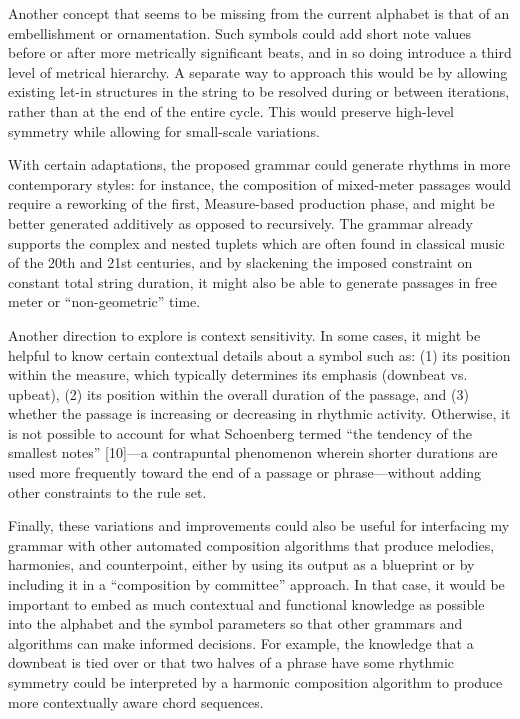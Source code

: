 \documentclass{article}
\begin{document}
Another concept that seems to be missing from the current alphabet is that of an embellishment or ornamentation. Such symbols could add short note values before or after more metrically significant beats, and in so doing introduce a third level of metrical hierarchy. A separate way to approach this would be by allowing existing let-in structures in the string to be resolved during or between iterations, rather than at the end of the entire cycle. This would preserve high-level symmetry while allowing for small-scale variations.

With certain adaptations, the proposed grammar could generate rhythms in more contemporary styles: for instance, the composition of mixed-meter passages would require a reworking of the first, Measure-based production phase, and might be better generated additively as opposed to recursively. The grammar already supports the complex and nested tuplets which are often found in classical music of the 20th and 21st centuries, and by slackening the imposed constraint on constant total string duration, it might also be able to generate passages in free meter or “non-geometric” time.

Another direction to explore is context sensitivity. In some cases, it might be helpful to know certain contextual details about a symbol such as: (1) its position within the measure, which typically determines its emphasis (downbeat vs. upbeat), (2) its position within the overall duration of the passage, and (3) whether the passage is increasing or decreasing in rhythmic activity. Otherwise, it is not possible to account for what Schoenberg termed “the tendency of the smallest notes” [10]—a contrapuntal phenomenon wherein shorter durations are used more frequently toward the end of a passage or phrase—without adding other constraints to the rule set.

Finally, these variations and improvements could also be useful for interfacing my grammar with other automated composition algorithms that produce melodies, harmonies, and counterpoint, either by using its output as a blueprint or by including it in a “composition by committee” approach. In that case, it would be important to embed as much contextual and functional knowledge as possible into the alphabet and the symbol parameters so that other grammars and algorithms can make informed decisions. For example, the knowledge that a downbeat is tied over or that two halves of a phrase have some rhythmic symmetry could be interpreted by a harmonic composition algorithm to produce more contextually aware chord sequences.


\end{document}
